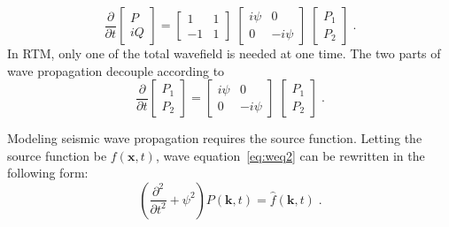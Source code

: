 \begin{equation}
 \label{eq:sep}
\frac{\partial}{\partial t}\left[ 
\begin{array}{c}
  P \\ 
  iQ \end{array} \right] =  
\left[ 
\begin{array}{cc}
  1  & 1 \\ 
 -1  & 1 \end{array} \right]
\; \left[ 
\begin{array}{cc}
  i\psi & 0 \\ 
  0     & -i\psi \end{array} \right] 
\; \left[
\begin{array}{c}
 P_1 \\ 
 P_2 \end{array} \right] \; . 
\end{equation}
In RTM, only one  of the total wavefield is needed at one time. 
The two parts of wave propagation decouple according to
\begin{equation}
 \label{eq:prop}
\frac{\partial}{\partial t}\left[ 
\begin{array}{c}
  P_1 \\ 
  P_2 \end{array} \right] 
= \left[ 
\begin{array}{cc}
  i\psi & 0 \\ 
  0     & -i\psi \end{array} \right] 
\; \left[
\begin{array}{c}
 P_1 \\ 
 P_2 \end{array} \right] \; .
\end{equation}


Modeling seismic wave propagation requires the source function. Letting the source function be $f(\mathbf{x},t)$, wave equation~\ref{eq:weq2} can be rewritten in the following form:
\begin{equation}
  \label{eq:weq3}
\left( \frac{\partial^2}{\partial t^2} + \psi^2 \right) P(\mathbf{k},t)=\hat{f}(\mathbf{k},t) \; .
\end{equation}

